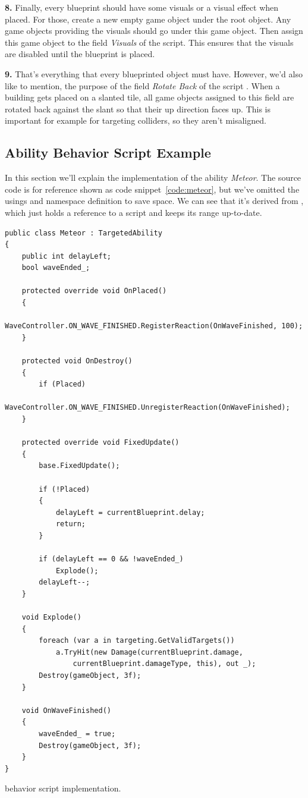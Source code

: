\textbf{8.}
Finally, every blueprint should have some visuals or a visual effect when placed.
For those, create a new empty game object under the root object.
Any game objects providing the visuals should go under this game object.
Then assign this game object to the field \emph{Visuals} of the  script.
This ensures that the visuals are disabled until the blueprint is placed.

\textbf{9.}
That's everything that every blueprinted object must have.
However, we'd also like to mention, the purpose of the field \emph{Rotate Back} of the script .
When a building gets placed on a slanted tile, all game objects assigned to this field are rotated back against the slant so that their up direction faces up.
This is important for example for targeting colliders, so they aren't misaligned.

\subsection{Ability Behavior Script Example}\label{sec:docs-meteor}
In this section we'll explain the implementation of the ability \emph{Meteor}.
The source code is for reference shown as code snippet~\ref{code:meteor}, but we've omitted the usings and namespace definition to save space.
We can see that it's derived from , which just holds a reference to a  script and keeps its range up-to-date.

\begin{listing}[H]
    \begin{verbatim}
public class Meteor : TargetedAbility
{
    public int delayLeft;
    bool waveEnded_;

    protected override void OnPlaced()
    {
        WaveController.ON_WAVE_FINISHED.RegisterReaction(OnWaveFinished, 100);
    }

    protected void OnDestroy()
    {
        if (Placed)
           WaveController.ON_WAVE_FINISHED.UnregisterReaction(OnWaveFinished);
    }

    protected override void FixedUpdate()
    {
        base.FixedUpdate();

        if (!Placed)
        {
            delayLeft = currentBlueprint.delay;
            return;
        }

        if (delayLeft == 0 && !waveEnded_)
            Explode();
        delayLeft--;
    }

    void Explode()
    {
        foreach (var a in targeting.GetValidTargets())
            a.TryHit(new Damage(currentBlueprint.damage,
                currentBlueprint.damageType, this), out _);
        Destroy(gameObject, 3f);
    }

    void OnWaveFinished()
    {
        waveEnded_ = true;
        Destroy(gameObject, 3f);
    }
}
    \end{verbatim}
    \caption{ behavior script implementation.}
    \label{code:meteor}
\end{listing}

